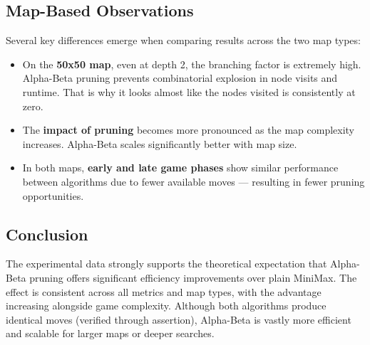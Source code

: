 \vspace{1em}

\subsection*{Map-Based Observations}

\noindent Several key differences emerge when comparing results across the two map types:

\begin{itemize}
    \item On the \textbf{50x50 map}, even at depth 2, the branching factor is extremely high. Alpha-Beta pruning prevents combinatorial explosion in node visits and runtime. That is why it looks almost like the nodes visited is consistently at zero.
    \item The \textbf{impact of pruning} becomes more pronounced as the map complexity increases. Alpha-Beta scales significantly better with map size.
    \item In both maps, \textbf{early and late game phases} show similar performance between algorithms due to fewer available moves — resulting in fewer pruning opportunities.
\end{itemize}

\vspace{1em}

\subsection*{Conclusion}

\noindent The experimental data strongly supports the theoretical expectation that Alpha-Beta pruning offers significant efficiency improvements over plain MiniMax. The effect is consistent across all metrics and map types, with the advantage increasing alongside game complexity. Although both algorithms produce identical moves (verified through assertion), Alpha-Beta is vastly more efficient and scalable for larger maps or deeper searches.
